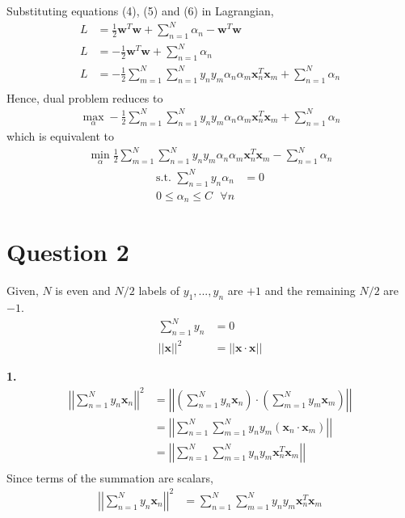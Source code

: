 \documentclass[12pt]{article}
\newcommand{\bd}[1]{\boldsymbol{#1}}
\begin{document}
Substituting equations (4), (5) and (6) in Lagrangian,
\begin{align*}
     L & = \frac{1}{2}\bd{w}^T\bd{w} +  \sum_{n=1}^N\alpha_n - \bd{w}^T\bd{w} \\
     L & = -\frac{1}{2}\bd{w}^T\bd{w} +  \sum_{n=1}^N\alpha_n \\
     L & = -\frac{1}{2}\sum_{m=1}^N\sum_{n=1}^Ny_ny_m\alpha_n\alpha_m\bd{x}_n^T\bd{x}_m +  \sum_{n=1}^N\alpha_n \\
\end{align*}
Hence, dual problem reduces to
\begin{align*}
    \max_{\alpha} -\frac{1}{2}\sum_{m=1}^N\sum_{n=1}^Ny_ny_m\alpha_n\alpha_m\bd{x}_n^T\bd{x}_m +  \sum_{n=1}^N\alpha_n
\end{align*}
which is equivalent to
\begin{align*}
    \min_{\alpha} \frac{1}{2}\sum_{m=1}^N\sum_{n=1}^Ny_ny_m\alpha_n\alpha_m\bd{x}_n^T\bd{x}_m -  \sum_{n=1}^N\alpha_n
\end{align*}
\begin{align*}
    \text{s.t. } \sum_{n=1}^Ny_n\alpha_n & = 0\\
    0 \leq \alpha_n \leq C \text{ \(\forall n\)}
\end{align*}

\section*{Question 2}
Given, \(N\) is even and \(N/2\) labels of \(y_1,...,y_n\) are \(+1\) and the remaining \(N/2\) are \(-1\).
\begin{align*}
    \sum_{n=1}^N y_n & = 0 \\
    ||\bd{x}||^2 & = ||\bd{x}\cdot\bd{x}||
\end{align*}

\textbf{1.}
\begin{align}\nonumber
    \left| \left| \sum_{n=1}^N y_n\bd{x}_n\right|\right|^2 & = \left|\left|\left(\sum_{n=1}^N y_n\bd{x}_n\right)\cdot\left(\sum_{m=1}^N y_m\bd{x}_m\right)\right|\right| \\ \nonumber
    & = \left| \left|\sum_{n=1}^N \sum_{m=1}^N y_ny_m (\bd{x}_n\cdot\bd{x}_m) \right| \right| \\ \nonumber
    & = \left| \left|\sum_{n=1}^N \sum_{m=1}^N y_ny_m\bd{x}_n^T\bd{x}_m \right| \right| \\ \nonumber
\end{align}
Since terms of the summation are scalars,
\begin{align}
    \left| \left| \sum_{n=1}^N y_n\bd{x}_n\right|\right|^2 & = \sum_{n=1}^N \sum_{m=1}^N y_ny_m\bd{x}_n^T\bd{x}_m \\ \nonumber
\end{align}
\end{document}
